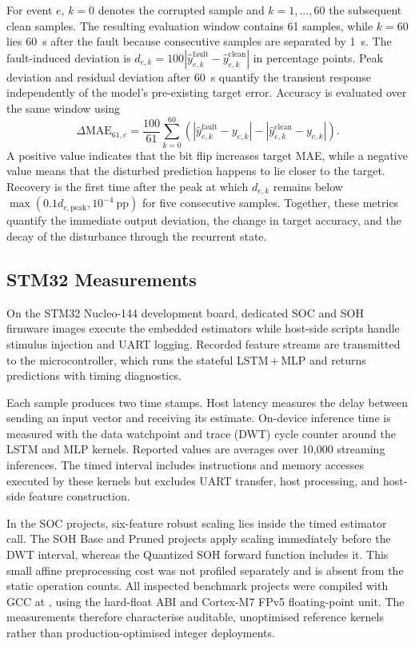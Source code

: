 \documentclass[final,3p,times]{elsarticle}
\newcommand{\code}[1]{\path{#1}}
\begin{document}
For event $e$, $k=0$ denotes the corrupted sample and $k=1,\ldots,60$ the subsequent clean samples. The resulting evaluation window contains 61 samples, while $k=60$ lies 60~s after the fault because consecutive samples are separated by 1~s. The fault-induced deviation is $d_{e,k}=100|\hat{y}^{\mathrm{fault}}_{e,k}-\hat{y}^{\mathrm{clean}}_{e,k}|$ in percentage points. Peak deviation and residual deviation after 60~s quantify the transient response independently of the model's pre-existing target error. Accuracy is evaluated over the same window using
\begin{equation}
\Delta\mathrm{MAE}_{61,e}=\frac{100}{61}\sum_{k=0}^{60}\left(\left|\hat{y}^{\mathrm{fault}}_{e,k}-y_{e,k}\right|-\left|\hat{y}^{\mathrm{clean}}_{e,k}-y_{e,k}\right|\right).
\label{eq:fault_mae_change}
\end{equation}
A positive value indicates that the bit flip increases target MAE, while a negative value means that the disturbed prediction happens to lie closer to the target. Recovery is the first time after the peak at which $d_{e,k}$ remains below $\max(0.1d_{e,\mathrm{peak}},10^{-4}\ \mathrm{pp})$ for five consecutive samples. Together, these metrics quantify the immediate output deviation, the change in target accuracy, and the decay of the disturbance through the recurrent state.

\subsection{STM32 Measurements}
On the STM32 Nucleo-144 development board, dedicated SOC and SOH firmware images execute the embedded estimators while host-side scripts handle stimulus injection and UART logging. Recorded feature streams are transmitted to the microcontroller, which runs the stateful LSTM\,+\,MLP and returns predictions with timing diagnostics.

Each sample produces two time stamps. Host latency measures the delay between sending an input vector and receiving its estimate. On-device inference time is measured with the data watchpoint and trace (DWT) cycle counter around the LSTM and MLP kernels. Reported values are averages over 10,000 streaming inferences. The timed interval includes instructions and memory accesses executed by these kernels but excludes UART transfer, host processing, and host-side feature construction.

In the SOC projects, six-feature robust scaling lies inside the timed estimator call. The SOH Base and Pruned projects apply scaling immediately before the DWT interval, whereas the Quantized SOH forward function includes it. This small affine preprocessing cost was not profiled separately and is absent from the static operation counts. All inspected benchmark projects were compiled with GCC at \code{-O0}, using the hard-float ABI and Cortex-M7 FPv5 floating-point unit. The measurements therefore characterise auditable, unoptimised reference kernels rather than production-optimised integer deployments.
\end{document}
